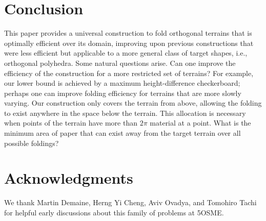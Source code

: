 \documentclass[10pt,twoside]{article}
\begin{document}
\maketitle

%







\section{Conclusion}

This paper provides a universal construction to fold orthogonal terrains that is
optimally efficient over its domain, improving upon previous constructions that
were less efficient but applicable to a more general class of target shapes,
i.e., orthogonal polyhedra. Some natural questions arise. Can one improve the
efficiency of the construction for a more restricted set of terrains? For
example, our lower bound is achieved by a maximum height-difference
checkerboard; perhaps one can improve folding efficiency for terrains that are
more slowly varying. Our construction only covers the terrain from above,
allowing the folding to exist anywhere in the space below the terrain. This
allocation is necessary when points of the terrain have more than $2\pi$
material at a point. What is the minimum area of paper that can exist away from
the target terrain over all possible foldings?

\section*{Acknowledgments}

We thank Martin Demaine, Herng Yi Cheng, Aviv Ovadya, and Tomohiro Tachi
for helpful early discussions about this family of problems at 5OSME.




\theaffiliations
\end{document}
